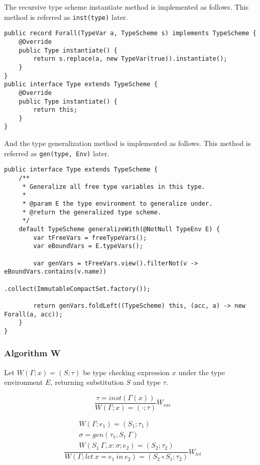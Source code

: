 \documentclass[a4paper]{article}
\begin{document}
The recursive type scheme instantiate method is implemented as follows.
This method is referred as \texttt{inst(type)} later.

\begin{verbatim}
public record Forall(TypeVar a, TypeScheme s) implements TypeScheme {
    @Override
    public Type instantiate() {
        return s.replace(a, new TypeVar(true)).instantiate();
    }
}
public interface Type extends TypeScheme {
    @Override
    public Type instantiate() {
        return this;
    }
}
\end{verbatim}

And the type generalization method is implemented as follows.
This method is referred as \texttt{gen(type, Env)} later.

\begin{verbatim}
public interface Type extends TypeScheme {
    /**
     * Generalize all free type variables in this type.
     *
     * @param E the type environment to generalize under.
     * @return the generalized type scheme.
     */
    default TypeScheme generalizeWith(@NotNull TypeEnv E) {
        var tFreeVars = freeTypeVars();
        var eBoundVars = E.typeVars();

        var genVars = tFreeVars.view().filterNot(v -> eBoundVars.contains(v.name))
                               .collect(ImmutableCompactSet.factory());

        return genVars.foldLeft((TypeScheme) this, (acc, a) -> new Forall(a, acc));
    }
}
\end{verbatim}

\subsubsection{Algorithm W}

Let $W(\Gamma; x) = (S; \tau)$ be type checking expression $x$ under the type environment $E$, returning substitution $S$ and type $\tau$.

\[
    \frac{\tau = inst(\Gamma(x))}{W(\Gamma; x) = (\cdot; \tau)}W_{var}
\]

\[
    \frac{
        \begin{array}{c}
            W(\Gamma; e_1)=(S_1;\tau_1)       \\
            \sigma = gen(\tau_1, S_1\ \Gamma) \\
            W(S_1\ \Gamma, x:\sigma;e_2) = (S_2;\tau_2)
        \end{array}
    }
    {W(\Gamma; let\ x = e_1\ in\ e_2) = (S_2 \circ S_1; \tau_2)}W_{let}
\]
\end{document}
